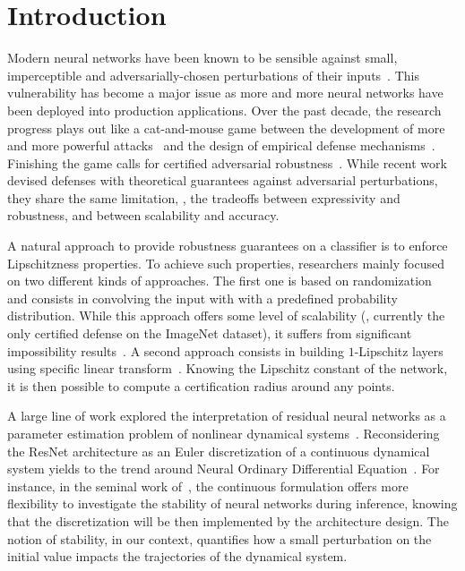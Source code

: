 

\section{Introduction}

Modern neural networks have been known to be sensible against small, imperceptible and adversarially-chosen perturbations of their inputs~\citep{biggio2013evasion,szegedy2014intriguing}.
This vulnerability  has become a major issue as more and more neural networks have been deployed into production applications.
Over the past decade, the research progress plays out like a cat-and-mouse game between the development of more and more powerful attacks~\citep{goodfellow2014explaining,kurakin2016adversarial,carlini2017adversarial,croce2020reliable} and the design of empirical defense mechanisms~\citep{madry2017towards,moosavi2019robustness,cohen2019certified}.
Finishing the game calls for certified adversarial robustness~\citep{raghunathan2018certified,wong2018scaling}.
While recent work devised defenses with theoretical guarantees against adversarial perturbations, they share the same limitation, \ie, the tradeoffs between expressivity and robustness, and between scalability and accuracy.

A natural approach to provide robustness guarantees on a classifier is to enforce Lipschitzness properties. 
To achieve such properties, researchers mainly focused on two different kinds of approaches.
The first one is based on randomization~\citep{lecuyer2018certified,cohen2019certified,pinot2019theoretical} and consists in convolving the input with with a predefined probability distribution.
While this approach offers some level of scalability (\ie, currently the only certified defense on the ImageNet dataset), it suffers from significant impossibility results~\cite{yang2020randomized}.
A second approach consists in building $1$-Lipschitz layers using specific linear transform~\citep{cisse2017parseval,li2019preventing,anil2019sorting,trockman2021orthogonalizing,skew2021sahil,li2019preventing,singla2021householder}.
Knowing the Lipschitz constant of the network, it is then possible to compute a certification radius around any points. 

A large line of work explored the interpretation of residual neural networks \cite{he2016deep} as a parameter estimation problem of nonlinear dynamical systems~\citep{haber2017stable,e17Proposal,lu18beyond}.
Reconsidering the ResNet architecture as an Euler discretization of a continuous dynamical system yields to the trend around Neural Ordinary Differential Equation~\citep{chen2018neural}.
For instance, in the seminal work of~\citet{haber2017stable}, the continuous formulation offers more flexibility to investigate the stability of neural networks during inference, knowing that the discretization will be then implemented by the architecture design.
The notion of stability, in our context, quantifies how a small perturbation on the initial value impacts the trajectories of the dynamical system. 

